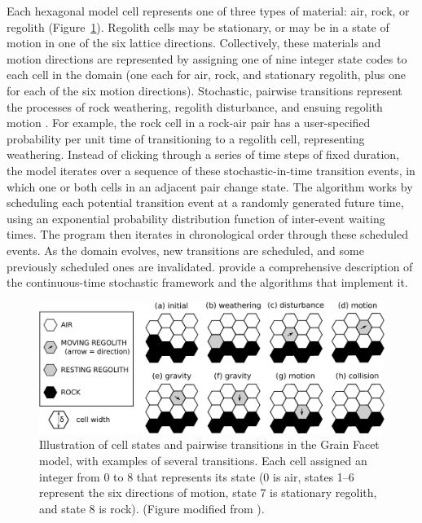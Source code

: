 Each hexagonal model cell represents one of three types of material: air, rock, or regolith (Figure~\ref{fig:cellstates}). Regolith cells may be stationary, or may be in a state of motion in one of the six lattice directions. Collectively, these materials and motion directions are represented by assigning one of nine integer state codes to each cell in the domain (one each for air, rock, and stationary regolith, plus one for each of the six motion directions). Stochastic, pairwise transitions represent the processes of rock weathering, regolith disturbance, and ensuing regolith motion \citep{tucker2016celllab,tucker2018lattice}. For example, the rock cell in a rock-air pair has a user-specified probability per unit time of transitioning to a regolith cell, representing weathering. Instead of clicking through a series of time steps of fixed duration, the model iterates over a sequence of these stochastic-in-time transition events, in which one or both cells in an adjacent pair change state. The algorithm works by scheduling each potential transition event at a randomly generated future time, using an exponential probability distribution function of inter-event waiting times. The program then iterates in chronological order through these scheduled events. As the domain evolves, new transitions are scheduled, and some previously scheduled ones are invalidated. \citet{tucker2016celllab} provide a comprehensive description of the continuous-time stochastic framework and the algorithms that implement it.

\begin{figure}[ht!]
\centerline{\includegraphics[scale=0.7]{figure6}}
\caption{Illustration of cell states and pairwise transitions in the Grain Facet model, with examples of several transitions. Each cell assigned an integer from 0 to 8 that represents its state (0 is air, states 1--6 represent the six directions of motion, state 7 is stationary regolith, and state 8 is rock). (Figure modified from \citet{tucker2018lattice}).}
\label{fig:cellstates}
\end{figure}

